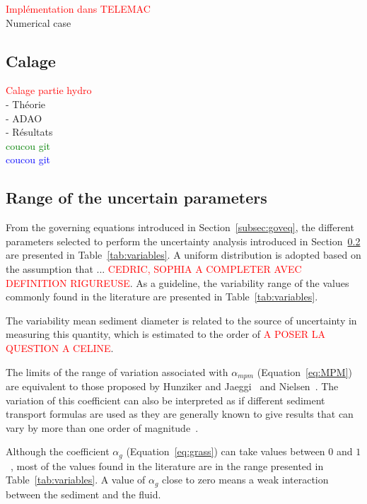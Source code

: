 \textcolor{red}{Implémentation dans TELEMAC} \\
Numerical case \\

\subsection{Calage}
\textcolor{red}{Calage partie hydro} \\
- Théorie \\
- ADAO \\
- Résultats\\
\textcolor{green}{coucou git} \\
\textcolor{blue}{coucou git} 

\subsection{Range of the uncertain parameters}
From the governing equations introduced in Section~\ref{subsec:goveq}, the different parameters selected to perform the uncertainty analysis introduced in Section~\ref{} are presented in Table~\ref{tab:variables}. A uniform distribution is adopted based on the assumption that ... \textcolor{red}{CEDRIC, SOPHIA A COMPLETER AVEC DEFINITION RIGUREUSE}. As a guideline, the variability range of the values commonly found in the literature are presented in Table~\ref{tab:variables}.

The variability mean sediment diameter is related to the source of uncertainty in measuring this quantity, which is estimated to the order of \textcolor{red}{A POSER LA QUESTION A CELINE}.

The limits of the range of variation associated with $\alpha_{mpm}$ (Equation~\ref{eq:MPM}) are equivalent to those proposed by Hunziker and Jaeggi~\cite{doi:10.1061/(ASCE)0733-9429(2002)128:12(1060)} and Nielsen~\cite{nielsen1992coastal}. The variation of this coefficient can also be interpreted as if different sediment transport formulas are used as they are generally known to give results that can vary by more than one order of magnitude~\cite{WRCR:WRCR12272}.

Although the coefficient $\alpha_g$ (Equation~\ref{eq:grass}) can take values between $0$ and $1$~\cite{diaz2008sediment}, most of the values found in the literature are in the range presented in Table~\ref{tab:variables}. A value of $\alpha_g$ close to zero means a weak interaction between the sediment and the fluid.

